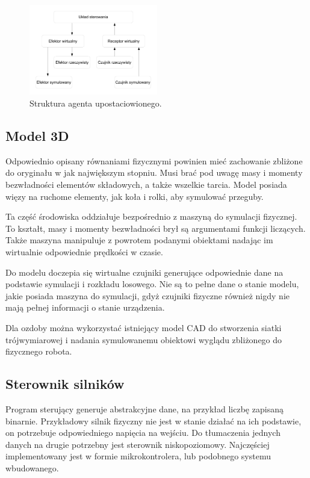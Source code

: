 \begin{figure}[H]
\centering
 \includegraphics[width=0.5\textwidth]{graphics/agent.pdf}
\caption{Struktura agenta upostaciowionego.}
\end{figure} 

\subsection{Model 3D}
Odpowiednio opisany równaniami fizycznymi powinien mieć zachowanie zbliżone do oryginału w jak największym stopniu.
Musi brać pod uwagę masy i momenty bezwładności elementów składowych, a także wszelkie tarcia.
Model posiada więzy na ruchome elementy, jak koła i rolki, aby symulować przeguby.

Ta część środowiska oddziałuje bezpośrednio z maszyną do symulacji fizycznej. 
To kształt, masy i momenty bezwładności brył są argumentami funkcji liczących.
Także maszyna manipuluje z powrotem podanymi obiektami nadając im wirtualnie odpowiednie prędkości w czasie.

Do modelu doczepia się wirtualne czujniki generujące odpowiednie dane na podstawie symulacji i rozkładu losowego.
Nie są to pełne dane o stanie modelu, jakie posiada maszyna do symulacji, gdyż czujniki fizyczne również nigdy nie mają pełnej informacji o stanie urządzenia.

Dla ozdoby można wykorzystać istniejący model CAD do stworzenia siatki trójwymiarowej i nadania symulowanemu obiektowi wyglądu zbliżonego do fizycznego robota.

 \subsection{Sterownik silników}
Program sterujący generuje abstrakcyjne dane, na przykład liczbę zapisaną binarnie.
Przykładowy silnik fizyczny nie jest w stanie działać na ich podstawie, on potrzebuje odpowiedniego napięcia na wejściu.
Do tłumaczenia jednych danych na drugie potrzebny jest sterownik niskopoziomowy.
Najczęściej implementowany jest w formie mikrokontrolera, lub podobnego systemu wbudowanego.

